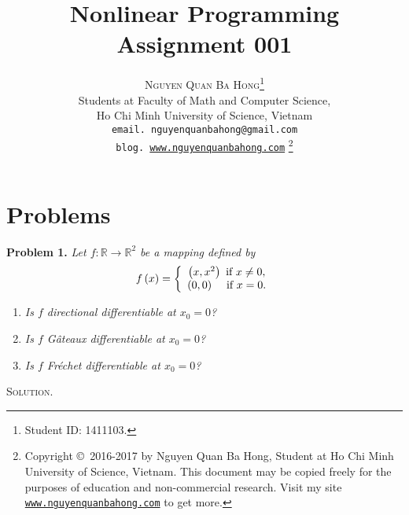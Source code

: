 \documentclass[a4paper]{article}
\title{\huge Nonlinear Programming Assignment 001}
\author{\textsc{Nguyen Quan Ba Hong}\footnote{Student ID: 1411103.}\\
{\small Students at Faculty of Math and Computer Science,}\\ 
{\small Ho Chi Minh University of Science, Vietnam} \\
{\small \texttt{email. nguyenquanbahong@gmail.com}}\\
{\small \texttt{blog. \url{www.nguyenquanbahong.com}} 
\footnote{Copyright \copyright\ 2016-2017 by Nguyen Quan Ba Hong, Student at Ho Chi Minh University of Science, Vietnam. This document may be copied freely for the purposes of education and non-commercial research. Visit my site \texttt{\url{www.nguyenquanbahong.com}} to get more.}}}
\numberwithin{equation}{section}
\begin{document}
\maketitle
\newpage
\tableofcontents
\newpage
\section{Problems}
\textbf{Problem 1.} \textit{Let $f:\mathbb{R}\to \mathbb{R}^2$ be a mapping defined by}
\begin{align}
\label{1.1}
f\left( x \right) = \left\{ {\begin{array}{*{20}{c}}
{\left( {x,{x^2}} \right)\mbox{ if } x \ne 0},\\
{\left( {0,0} \right)\hspace{0.3cm}\mbox{ if } x = 0}.
\end{array}} \right.
\end{align}
\begin{enumerate}
\item \textit{Is $f$ directional differentiable at $x_0 =0$?}
\item \textit{Is $f$ G\^{a}teaux differentiable at $x_0 =0$?}
\item \textit{Is $f$ Fr\'{e}chet differentiable at $x_0=0$?}
\end{enumerate}
\textsc{Solution.} 
\end{document}
